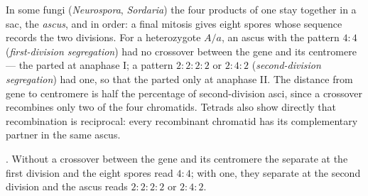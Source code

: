 \begin{proposition}\label{prop:b2:meiosis-heredity:tetrads}
In some fungi (\emph{Neurospora}, \emph{Sordaria}) the four products
of one  stay together in a sac, the \emph{ascus}, and in
order: a final mitosis gives eight spores whose sequence records the
two divisions. For a heterozygote $A/a$, an ascus with the pattern
$4 : 4$ (\emph{first-division segregation}) had no crossover between
the gene and its centromere --- the  parted at anaphase I; a
pattern $2 : 2 : 2 : 2$ or $2 : 4 : 2$ (\emph{second-division
segregation}) had one, so that the  parted only at anaphase
II. The distance from gene to centromere is half the percentage of
second-division asci, since a crossover recombines only two of the
four chromatids. Tetrads also show directly that recombination is
reciprocal: every recombinant chromatid has its complementary
partner in the same ascus.
\end{proposition}

\begin{omfigure}

{\small {}. Without a crossover between the gene and
its centromere the  separate at the first division and the
eight spores read $4 : 4$; with one, they separate at the second
division and the ascus reads $2 : 2 : 2 : 2$ or $2 : 4 : 2$.}
\end{omfigure}


